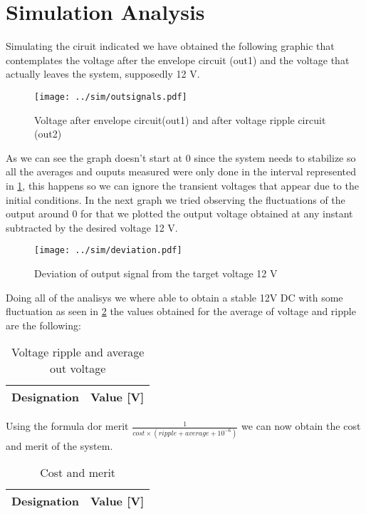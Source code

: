 \section{Simulation Analysis}

Simulating the ciruit indicated we have obtained the following graphic that contemplates the voltage after the envelope circuit (out1) and the voltage that actually leaves the system, supposedly 12 V.

\begin{figure}[H]
  \centering
  \small
  \texttt{[image: ../sim/outsignals.pdf]}
  \caption{Voltage after envelope circuit(out1) and after voltage ripple circuit (out2)}
  \label{fig:out1_out2}
\end{figure}

As we can see the graph doesn't start at 0 since the system needs to stabilize so all the averages and ouputs measured were only done in the interval represented in \ref{fig:out1_out2}, this happens so we can ignore the transient voltages that appear due to the initial conditions.
In the next graph we tried observing the fluctuations of the output around 0 for that we plotted the output voltage obtained at any instant subtracted by the desired voltage 12 V.

\begin{figure}[H]
  \centering
  \texttt{[image: ../sim/deviation.pdf]}
  \vspace{-5mm}
  \caption{Deviation of output signal from the target voltage 12 V }
  \label{fig:deviation}
\end{figure}

Doing all of the analisys we where able to obtain a stable 12V DC  with some fluctuation as seen in \ref{fig:deviation} the values obtained for the average of voltage and ripple are the following:

\begin{table}[H]
  \centering
  \begin{tabular}{|c|c|}
    \hline
        {\bf Designation} & {\bf Value [V]} \\ \hline
        
  \end{tabular}
  \caption{Voltage ripple and average out voltage} 
  \label{tab:rip}
\end{table}

Using the formula dor merit $\frac{1}{cost \times (ripple +average+10^{-6})}$ we can now obtain the cost and merit of the system.


\begin{table}[H]
  \centering
  \begin{tabular}{|c|c|}
    \hline
        {\bf Designation} & {\bf Value [V]} \\ \hline
        
  \end{tabular}
  \caption{Cost and merit} 
  \label{tab:rip}
\end{table}

